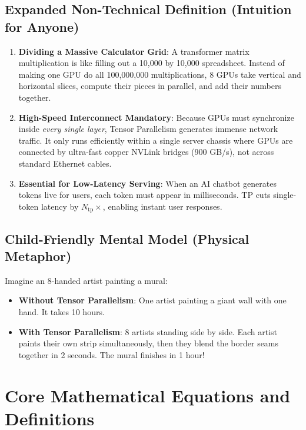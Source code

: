 \documentclass[11pt,a4paper]{article}
\theoremstyle{definition}
\begin{document}
\subsection{Expanded Non-Technical Definition (Intuition for Anyone)}
\begin{enumerate}
    \item \textbf{Dividing a Massive Calculator Grid}: A transformer matrix multiplication is like filling out a 10,000 by 10,000 spreadsheet. Instead of making one GPU do all 100,000,000 multiplications, 8 GPUs take vertical and horizontal slices, compute their pieces in parallel, and add their numbers together.
    \item \textbf{High-Speed Interconnect Mandatory}: Because GPUs must synchronize inside \emph{every single layer}, Tensor Parallelism generates immense network traffic. It only runs efficiently within a single server chassis where GPUs are connected by ultra-fast copper NVLink bridges (900 GB/s), not across standard Ethernet cables.
    \item \textbf{Essential for Low-Latency Serving}: When an AI chatbot generates tokens live for users, each token must appear in milliseconds. TP cuts single-token latency by $N_{\text{tp}}\times$, enabling instant user responses.
\end{enumerate}

\subsection{Child-Friendly Mental Model (Physical Metaphor)}
Imagine an 8-handed artist painting a mural:
\begin{itemize}
    \item \textbf{Without Tensor Parallelism}: One artist painting a giant wall with one hand. It takes 10 hours.
    \item \textbf{With Tensor Parallelism}: 8 artists standing side by side. Each artist paints their own strip simultaneously, then they blend the border seams together in 2 seconds. The mural finishes in 1 hour!
\end{itemize}

\section{Core Mathematical Equations and Definitions}
\end{document}

